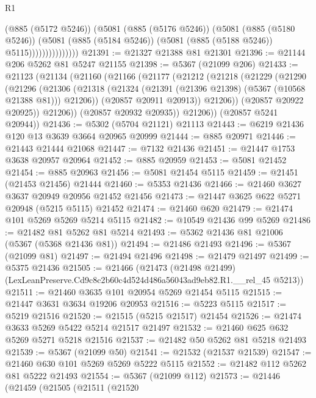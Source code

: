 \begin{lexlean}{R1}
\begin{coremodule}
                          (@885 (@5172 @5246))
                          (@5081
                            (@885 (@5176 @5246))
                            (@5081
                              (@885 (@5180 @5246))
                              (@5081
                                (@885 (@5184 @5246))
                                (@5081 (@885 (@5188 @5246)) @5115)))))))))))))))
@21391 := @21327 @21388 @81 @21301
@21396 := @21144 @206 @5262 @81 @5247 @21155
@21398 := @5367 (@21099 @206)
@21433 := @21123
    (@21134
      (@21160
        (@21166
          (@21177
            (@21212
              (@21218
                (@21229
                  (@21290
                    (@21296
                      (@21306
                        (@21318
                          (@21324 (@21391 (@21396 @21398) (@5367 (@10568 @21388 @81))) @21206))
                        (@20857 @20911 @20913))
                      @21206))
                  (@20857 @20922 @20925))
                @21206))
            (@20857 @20932 @20935))
          @21206))
      (@20857 @5241 @20944))
@21436 := @5302 (@5704 @21121) @21113
@21443 := @6219 @21436 @120 @13 @3639 @3664 @20965 @20999
@21444 := @885 @20971
@21446 := @21443 @21444 @21068
@21447 := @7132 @21436
@21451 := @21447 @1753 @3638 @20957 @20964
@21452 := @885 @20959
@21453 := @5081 @21452
@21454 := @885 @20963
@21456 := @5081 @21454 @5115
@21459 := @21451 (@21453 @21456) @21444
@21460 := @5353 @21436
@21466 := @21460 @3627 @3637 @20949 @20956 @21452 @21456
@21473 := @21447 @3625 @622 @5271 @20948 (@5215 @5115) @21452
@21474 := @21460 @620
@21479 := @21474 @101 @5269 @5269 @5214 @5115
@21482 := @10549 @21436 @99 @5269
@21486 := @21482 @81 @5262 @81 @5214
@21493 := @5362 @21436 @81 @21006 (@5367 (@5368 @21436 @81))
@21494 := @21486 @21493
@21496 := @5367 (@21099 @81)
@21497 := @21494 @21496
@21498 := @21479 @21497
@21499 := @5375 @21436
@21505 := @21466
    (@21473 (@21498 @21499) (LexLeanPreserve.Cd9c8c2b60c4d524d486a56043ad9eb82.R1.__rel_45 @5213))
@21511 := @21460 @3635 @101 @20954 @5269 @21454 @5115
@21515 := @21447 @3631 @3634 @19206 @20953
@21516 := @5223 @5115
@21517 := @5219 @21516
@21520 := @21515 (@5215 @21517) @21454
@21526 := @21474 @3633 @5269 @5422 @5214 @21517 @21497
@21532 := @21460 @625 @632 @5269 @5271 @5218 @21516
@21537 := @21482 @50 @5262 @81 @5218 @21493
@21539 := @5367 (@21099 @50)
@21541 := @21532 (@21537 @21539)
@21547 := @21460 @630 @101 @5269 @5269 @5222 @5115
@21552 := @21482 @112 @5262 @81 @5222 @21493
@21554 := @5367 (@21099 @112)
@21573 := @21446
    (@21459
      (@21505
        (@21511
          (@21520

\end{coremodule}
\end{lexlean}
